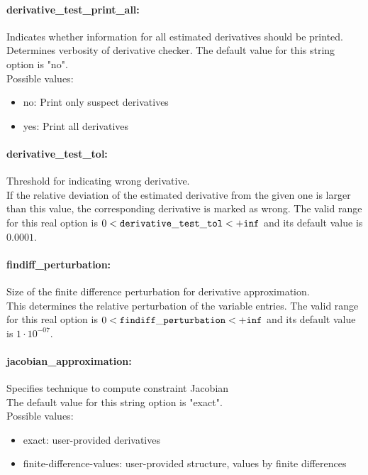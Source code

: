 \paragraph{derivative\_test\_print\_all:}\label{sec:derivative_test_print_all} Indicates whether information for all estimated derivatives should be printed. $\;$ \\
 Determines verbosity of derivative checker.
The default value for this string option is "no".
\\ 
Possible values:
\begin{itemize}
   \item no: Print only suspect derivatives
   \item yes: Print all derivatives
\end{itemize}

\paragraph{derivative\_test\_tol:}\label{sec:derivative_test_tol} Threshold for indicating wrong derivative. $\;$ \\
 If the relative deviation of the estimated
derivative from the given one is larger than this
value, the corresponding derivative is marked as
wrong. The valid range for this real option is 
$0 <  {\tt derivative\_test\_tol } <  {\tt +inf}$
and its default value is $0.0001$.


\paragraph{findiff\_perturbation:}\label{sec:findiff_perturbation} Size of the finite difference perturbation for derivative approximation. $\;$ \\
 This determines the relative perturbation of the
variable entries. The valid range for this real option is 
$0 <  {\tt findiff\_perturbation } <  {\tt +inf}$
and its default value is $1 \cdot 10^{-07}$.


\paragraph{jacobian\_approximation:}\label{sec:jacobian_approximation} Specifies technique to compute constraint Jacobian $\;$ \\

The default value for this string option is "exact".
\\ 
Possible values:
\begin{itemize}
   \item exact: user-provided derivatives
   \item finite-difference-values: user-provided structure, values by finite
differences
\end{itemize}


